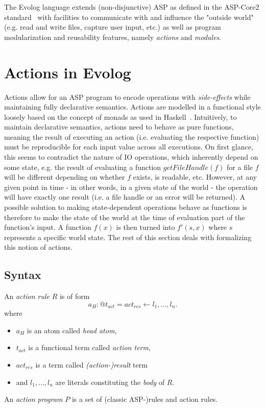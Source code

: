 The Evolog language extends (non-disjunctive) ASP as defined in the ASP-Core2 standard~\cite{asp-core2} with facilities to communicate with and influence the "outside world" (e.g. read and write files, capture user input, etc.) as well as program modularization and reusability features, namely \emph{actions} and \emph{modules}.

\section{Actions in Evolog}
\label{sec:evolog-actions}

Actions allow for an ASP program to encode operations with \emph{side-effects} while maintaining fully declarative semantics. Actions are modelled in a functional style loosely based on the concept of monads as used in Haskell~. Intuitively, to maintain declarative semantics, actions need to behave as pure functions, meaning the result of executing an action (i.e. evaluating the respective function) must be reproducible for each input value across all executions. On first glance, this seems to contradict the nature of IO operations, which inherently depend on some state, e.g. the result of evaluating a function $getFileHandle(f)$ for a file $f$ will be different depending on whether $f$ exists, is readable, etc. However, at any given point in time - in other words, in a given state of the world - the operation will have exactly one result (i.e. a file handle or an error will be returned). A possible solution to making state-dependent operations behave as functions is therefore to make the state of the world at the time of evaluation part of the function's input. A function $f(x)$ is then turned into $f'(s, x)$  where $s$ represents a specific world state. The rest of this section deals with formalizing this notion of actions.

\subsection{Syntax}
\label{subsec:evolog-actions-syntax}

\begin{definition}
\label{def:action-rule-syntax}
An \emph{action rule} $R$ is of form
\[
	a_H : @t_{act} = act_{res} \leftarrow l_1,\ldots,l_n.
\]
where
\begin{itemize}
	\item $a_H$ is an atom called \emph{head atom},
	\item $t_{act}$ is a functional term called \emph{action term},
	\item $act_{res}$ is a term called \emph{(action-)result} term
	\item and $l_1,\ldots,l_n$ are literals constituting the \emph{body} of $R$.
\end{itemize}
An \emph{action program} $P$ is a set of (classic ASP-)rules and action rules.
\end{definition}

